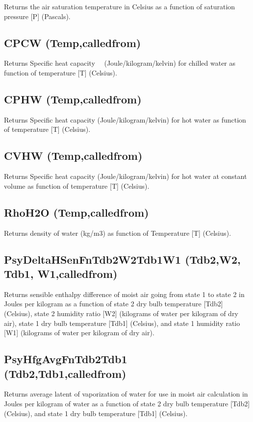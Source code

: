 Returns the air saturation temperature in Celsius as a function of saturation pressure {[}P{]} (Pascals).

\subsection{CPCW (Temp,calledfrom)}\label{cpcw-tempcalledfrom}

Returns Specific heat capacity~~ (Joule/kilogram/kelvin) for chilled water as function of temperature {[}T{]} (Celsius).

\subsection{CPHW (Temp,calledfrom)}\label{cphw-tempcalledfrom}

Returns Specific heat capacity (Joule/kilogram/kelvin) for hot water as function of temperature {[}T{]} (Celsius).

\subsection{CVHW (Temp,calledfrom)}\label{cvhw-tempcalledfrom}

Returns Specific heat capacity (Joule/kilogram/kelvin) for hot water at constant volume as function of temperature {[}T{]} (Celsius).

\subsection{RhoH2O (Temp,calledfrom)}\label{rhoh2o-tempcalledfrom}

Returns density of water (kg/m3) as function of Temperature {[}T{]} (Celsius).

\subsection{PsyDeltaHSenFnTdb2W2Tdb1W1 (Tdb2,W2, Tdb1, W1,calledfrom)}\label{psydeltahsenfntdb2w2tdb1w1-tdb2w2tdb1w1calledfrom}

Returns sensible enthalpy difference of moist air going from state 1 to state 2 in Joules per kilogram as a function of state 2 dry bulb temperature {[}Tdb2{]} (Celsius), state 2 humidity ratio {[}W2{]} (kilograms of water per kilogram of dry air), state 1 dry bulb temperature {[}Tdb1{]} (Celsius), and state 1 humidity ratio {[}W1{]} (kilograms of water per kilogram of dry air).

\subsection{PsyHfgAvgFnTdb2Tdb1 (Tdb2,Tdb1,calledfrom)}\label{psyhfgavgfntdb2tdb1-tdb2w2tdb1calledfrom}

Returns average latent of vaporization of water for use in moist air calculation in Joules per kilogram of water as a function of state 2 dry bulb temperature {[}Tdb2{]} (Celsius), and state 1 dry bulb temperature {[}Tdb1{]} (Celsius).